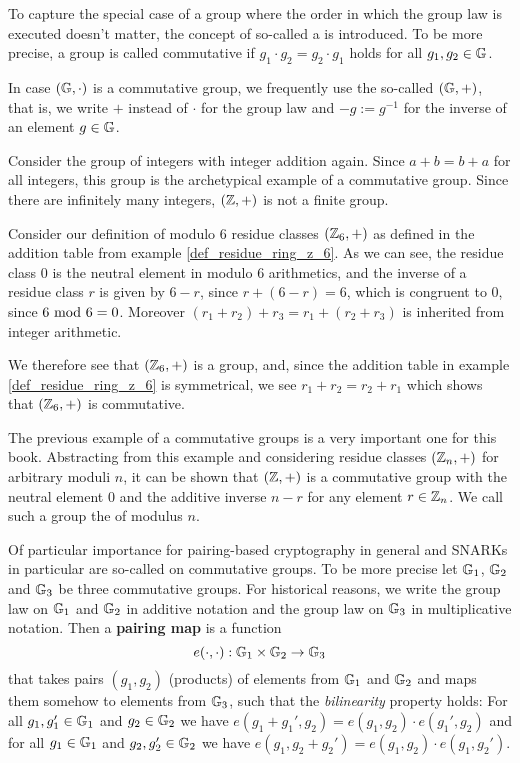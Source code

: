 To capture the special case of a group where the order in which the group law is executed doesn't matter, the concept of so-called a  is introduced. To be more precise, a group is called commutative if  $g_1\cdot g_2 = g_2 \cdot g_1$ holds for all $g_1,g_2\in\mathbb{G}$.
\begin{notation}
In case $(\mathbb{G},\cdot)$ is a commutative group, we frequently use the so-called  $(\mathbb{G},+)$, that is, we write $+$ instead of $\cdot$ for the group law and $-g:=g^{-1}$ for the inverse of an element $g\in\mathbb{G}$.
\end{notation}
\begin{example} Consider the group of integers with integer addition again.
Since $a+b=b+a$ for all integers, this group is the archetypical example of a commutative group. Since there are infinitely many integers, $(\mathbb{Z},+)$ is not a finite group.
\end{example}
\begin{example} Consider our definition of modulo $6$ residue classes $(\mathbb{Z}_6,+)$ as defined in the addition table from example \ref{def_residue_ring_z_6}. As we can see, the residue class $0$ is the neutral element in modulo $6$ arithmetics, and the inverse of a residue class $r$ is given by $6-r$, since $r+(6-r)=6$, which is congruent to $0$, since $6 \text{ mod } 6=0$. Moreover $(r_1+r_2)+r_3=r_1+(r_2+r_3)$ is inherited from integer arithmetic.

We therefore see that $(\mathbb{Z}_6,+)$ is a group, and, since the addition table in example \ref{def_residue_ring_z_6} is symmetrical, we see $r_1+r_2 = r_2+r_1$ which shows that $(\mathbb{Z}_6,+)$ is commutative.
\end{example}
The previous example of a commutative groups is a very important one for this book. Abstracting from this example and considering residue classes $(\mathbb{Z}_n,+)$ for arbitrary moduli $n$, it can be shown that $(\mathbb{Z},+)$ is a commutative group with the neutral element $0$ and the additive inverse $n-r$ for any element $r\in\mathbb{Z}_n$. We call such a group the  of modulus $n$.

Of particular importance for pairing-based cryptography in general and SNARKs in particular are so-called  on commutative groups. To be more precise let $\mathbb{G}_1$, $\mathbb{G}_2$ and $\mathbb{G}_3$ be three commutative groups. For historical reasons, we write the group law on $\mathbb{G}_1$ and $\mathbb{G}_2$ in additive notation and the group law on $\mathbb{G}_3$ in multiplicative notation. Then a \textbf{pairing map} is a function
\begin{equation}
e(\cdot,\cdot): \mathbb{G}_1 \times \mathbb{G}_2 \to \mathbb{G}_3
\end{equation}
that takes pairs $(g_1,g_2)$ (products) of elements from $\mathbb{G}_1$ and $\mathbb{G}_2$ and maps them somehow to elements from $\mathbb{G}_3$, such that the \textit{bilinearity} property holds: For all $g_1,g_1'\in \mathbb{G}_1$ and $g_2\in \mathbb{G}_2$ we have $e(g_1+ g_1',g_2)= e(g_1,g_2)\cdot e(g_1',g_2)$ and for all $g_1\in \mathbb{G}_1$ and $g_2, g_2'\in \mathbb{G}_2$ we have $e(g_1,g_2+ g_2')= e(g_1,g_2)\cdot e(g_1,g_2')$.

